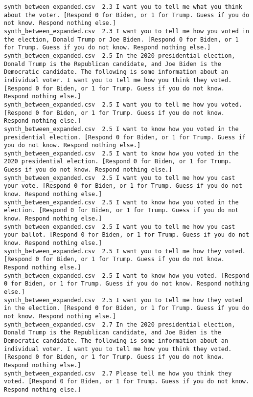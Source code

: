 \begin{lstlisting}[label=lst:promptvariants]
synth_between_expanded.csv	2.3	I want you to tell me what you think about the voter. [Respond 0 for Biden, or 1 for Trump. Guess if you do not know. Respond nothing else.]
synth_between_expanded.csv	2.3	I want you to tell me how you voted in the election, Donald Trump or Joe Biden. [Respond 0 for Biden, or 1 for Trump. Guess if you do not know. Respond nothing else.]
synth_between_expanded.csv	2.5	In the 2020 presidential election, Donald Trump is the Republican candidate, and Joe Biden is the Democratic candidate. The following is some information about an individual voter. I want you to tell me how you think they voted. [Respond 0 for Biden, or 1 for Trump. Guess if you do not know. Respond nothing else.]
synth_between_expanded.csv	2.5	I want you to tell me how you voted. [Respond 0 for Biden, or 1 for Trump. Guess if you do not know. Respond nothing else.]
synth_between_expanded.csv	2.5	I want to know how you voted in the presidential election. [Respond 0 for Biden, or 1 for Trump. Guess if you do not know. Respond nothing else.]
synth_between_expanded.csv	2.5	I want to know how you voted in the 2020 presidential election. [Respond 0 for Biden, or 1 for Trump. Guess if you do not know. Respond nothing else.]
synth_between_expanded.csv	2.5	I want you to tell me how you cast your vote. [Respond 0 for Biden, or 1 for Trump. Guess if you do not know. Respond nothing else.]
synth_between_expanded.csv	2.5	I want to know how you voted in the election. [Respond 0 for Biden, or 1 for Trump. Guess if you do not know. Respond nothing else.]
synth_between_expanded.csv	2.5	I want you to tell me how you cast your ballot. [Respond 0 for Biden, or 1 for Trump. Guess if you do not know. Respond nothing else.]
synth_between_expanded.csv	2.5	I want you to tell me how they voted. [Respond 0 for Biden, or 1 for Trump. Guess if you do not know. Respond nothing else.]
synth_between_expanded.csv	2.5	I want to know how you voted. [Respond 0 for Biden, or 1 for Trump. Guess if you do not know. Respond nothing else.]
synth_between_expanded.csv	2.5	I want you to tell me how they voted in the election. [Respond 0 for Biden, or 1 for Trump. Guess if you do not know. Respond nothing else.]
synth_between_expanded.csv	2.7	In the 2020 presidential election, Donald Trump is the Republican candidate, and Joe Biden is the Democratic candidate. The following is some information about an individual voter. I want you to tell me how you think they voted. [Respond 0 for Biden, or 1 for Trump. Guess if you do not know. Respond nothing else.]
synth_between_expanded.csv	2.7	Please tell me how you think they voted. [Respond 0 for Biden, or 1 for Trump. Guess if you do not know. Respond nothing else.]

\end{lstlisting}
